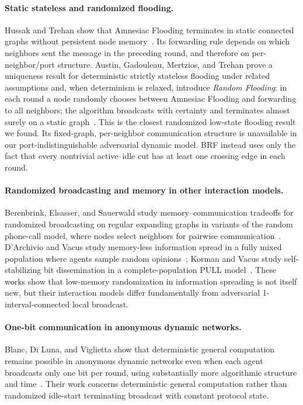 \documentclass[11pt]{article}
\newcommand{\BRF}{\textsc{BRF}}
\begin{document}
\paragraph{Static stateless and randomized flooding.}
Hussak and Trehan show that Amnesiac Flooding terminates in static connected graphs without persistent node memory~\cite{HussakTrehan2023}. Its forwarding rule depends on which neighbors sent the message in the preceding round, and therefore on per-neighbor/port structure. Austin, Gadouleau, Mertzios, and Trehan prove a uniqueness result for deterministic strictly stateless flooding under related assumptions and, when determinism is relaxed, introduce \emph{Random Flooding}: in each round a node randomly chooses between Amnesiac Flooding and forwarding to all neighbors; the algorithm broadcasts with certainty and terminates almost surely on a static graph~\cite{AustinEtAl2025}. This is the closest randomized low-state flooding result we found. Its fixed-graph, per-neighbor communication structure is unavailable in our port-indistinguishable adversarial dynamic model. \BRF{} instead uses only the fact that every nontrivial active--idle cut has at least one crossing edge in each round.

\paragraph{Randomized broadcasting and memory in other interaction models.}
Berenbrink, Elsasser, and Sauerwald study memory--communication tradeoffs for randomized broadcasting on regular expanding graphs in variants of the random phone-call model, where nodes select neighbors for pairwise communication~\cite{BerenbrinkElsasserSauerwald2014}. D'Archivio and Vacus study memory-less information spread in a fully mixed population where agents sample random opinions~\cite{DArchivioVacus2024}; Korman and Vacus study self-stabilizing bit dissemination in a complete-population PULL model~\cite{KormanVacus2024}. These works show that low-memory randomization in information spreading is not itself new, but their interaction models differ fundamentally from adversarial 1-interval-connected local broadcast.

\paragraph{One-bit communication in anonymous dynamic networks.}
Blanc, Di Luna, and Viglietta show that deterministic general computation remains possible in anonymous dynamic networks even when each agent broadcasts only one bit per round, using substantially more algorithmic structure and time~\cite{BlancDiLunaViglietta2026}. Their work concerns deterministic general computation rather than randomized idle-start terminating broadcast with constant protocol state.
\end{document}
